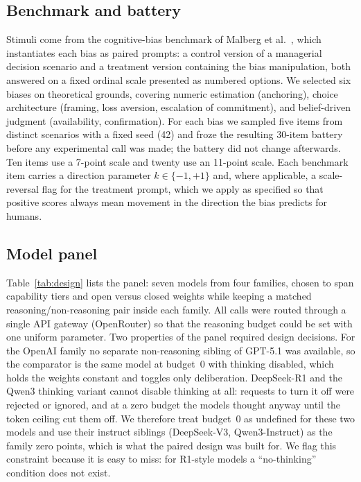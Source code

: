 \documentclass[conference]{IEEEtran}
\begin{document}
\subsection{Benchmark and battery}
Stimuli come from the cognitive-bias benchmark of Malberg et al.~\cite{malberg2024comprehensive}, which instantiates each bias as paired prompts: a control version of a managerial decision scenario and a treatment version containing the bias manipulation, both answered on a fixed ordinal scale presented as numbered options. We selected six biases on theoretical grounds, covering numeric estimation (anchoring), choice architecture (framing, loss aversion, escalation of commitment), and belief-driven judgment (availability, confirmation). For each bias we sampled five items from distinct scenarios with a fixed seed (42) and froze the resulting 30-item battery before any experimental call was made; the battery did not change afterwards. Ten items use a 7-point scale and twenty use an 11-point scale. Each benchmark item carries a direction parameter $k \in \{-1, +1\}$ and, where applicable, a scale-reversal flag for the treatment prompt, which we apply as specified so that positive scores always mean movement in the direction the bias predicts for humans.

\subsection{Model panel}
Table~\ref{tab:design} lists the panel: seven models from four families, chosen to span capability tiers and open versus closed weights while keeping a matched reasoning/non-reasoning pair inside each family. All calls were routed through a single API gateway (OpenRouter) so that the reasoning budget could be set with one uniform parameter. Two properties of the panel required design decisions. For the OpenAI family no separate non-reasoning sibling of GPT-5.1 was available, so the comparator is the same model at budget~0 with thinking disabled, which holds the weights constant and toggles only deliberation. DeepSeek-R1 and the Qwen3 thinking variant cannot disable thinking at all: requests to turn it off were rejected or ignored, and at a zero budget the models thought anyway until the token ceiling cut them off. We therefore treat budget~0 as undefined for these two models and use their instruct siblings (DeepSeek-V3, Qwen3-Instruct) as the family zero points, which is what the paired design was built for. We flag this constraint because it is easy to miss: for R1-style models a ``no-thinking'' condition does not exist.
\end{document}
